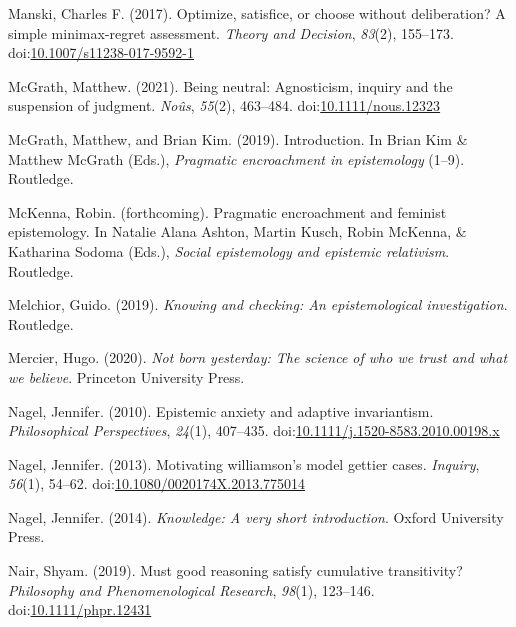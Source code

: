 \documentclass[
  12pt,
  letterpaper,
]{scrbook}
\newlength{\cslhangindent}
\newenvironment{CSLReferences}[2] %
 {\begin{list}{}{%
  \setlength{\itemindent}{0pt}
  \setlength{\leftmargin}{0pt}
  \setlength{\parsep}{0pt}
  \ifodd #1
   \setlength{\leftmargin}{\cslhangindent}
   \setlength{\itemindent}{-1\cslhangindent}
  \fi
  \setlength{\itemsep}{#2\baselineskip}}}
 {\end{list}}
\begin{document}
\begin{CSLReferences}{1}{0}
Manski, Charles F. (2017). Optimize, satisfice, or choose without
deliberation? A simple minimax-regret assessment. \emph{Theory and
Decision}, \emph{83}(2), 155--173.
doi:\href{https://doi.org/10.1007/s11238-017-9592-1}{10.1007/s11238-017-9592-1}

McGrath, Matthew. (2021). Being neutral: Agnosticism, inquiry and the
suspension of judgment. \emph{No{û}s}, \emph{55}(2), 463--484.
doi:\href{https://doi.org/10.1111/nous.12323}{10.1111/nous.12323}

McGrath, Matthew, and Brian Kim. (2019). Introduction. In Brian Kim \&
Matthew McGrath (Eds.), \emph{Pragmatic encroachment in epistemology}
(1--9). Routledge.

McKenna, Robin. (forthcoming). Pragmatic encroachment and feminist
epistemology. In Natalie Alana Ashton, Martin Kusch, Robin McKenna, \&
Katharina Sodoma (Eds.), \emph{Social epistemology and epistemic
relativism}. Routledge.

Melchior, Guido. (2019). \emph{Knowing and checking: An epistemological
investigation}. Routledge.

Mercier, Hugo. (2020). \emph{Not born yesterday: The science of who we
trust and what we believe}. Princeton University Press.

Nagel, Jennifer. (2010). Epistemic anxiety and adaptive invariantism.
\emph{Philosophical Perspectives}, \emph{24}(1), 407--435.
doi:\href{https://doi.org/10.1111/j.1520-8583.2010.00198.x}{10.1111/j.1520-8583.2010.00198.x}

Nagel, Jennifer. (2013). Motivating williamson's model gettier cases.
\emph{Inquiry}, \emph{56}(1), 54--62.
doi:\href{https://doi.org/10.1080/0020174X.2013.775014}{10.1080/0020174X.2013.775014}

Nagel, Jennifer. (2014). \emph{Knowledge: A very short introduction}.
Oxford University Press.

Nair, Shyam. (2019). Must good reasoning satisfy cumulative
transitivity? \emph{Philosophy and Phenomenological Research},
\emph{98}(1), 123--146.
doi:\href{https://doi.org/10.1111/phpr.12431}{10.1111/phpr.12431}


\end{CSLReferences}
\end{document}
